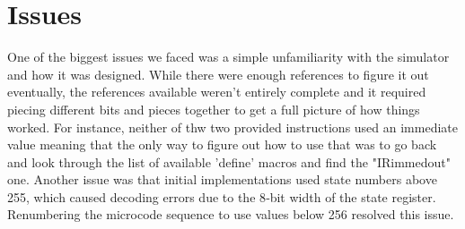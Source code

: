 \documentclass[acmtog]{acmart}
\begin{document}
\section{Issues}
One of the biggest issues we faced was a simple unfamiliarity with the simulator and how it was designed. While there were enough references to figure it out
eventually, the references available weren't entirely complete and it required piecing different bits and pieces together to get a full picture of how things
worked. For instance, neither of thw two provided instructions used an immediate value meaning that the only way to figure out how to use that was to go back 
and look through the list of available 'define' macros and find the "IRimmedout" one.
Another issue was that initial implementations used state numbers above 255, which caused decoding errors due to the 8‑bit width of the state register. 
Renumbering the microcode sequence to use values below 256 resolved this issue.
\end{document}
